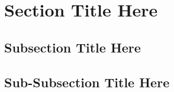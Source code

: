 \label{chap:app_A}
\section{Section Title Here}
\subsection{Subsection Title Here}
\subsection{Sub-Subsection Title Here}